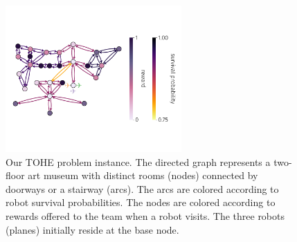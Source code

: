 \documentclass[11pt, oneside]{article}
\begin{document}

\begin{figure}[h!]
    \centering
    	\includegraphics[width=0.6\textwidth]{../art_museum_full_setup.pdf}
    \caption{Our TOHE problem instance. The directed graph represents a two-floor art museum with distinct rooms (nodes) connected by doorways or a stairway (arcs). The arcs are colored according to robot survival probabilities. The nodes are colored according to rewards offered to the team when a robot visits. The three robots (planes) initially reside at the base node. %
    } \label{fig:ex_setup}
\end{figure}
\end{document}
